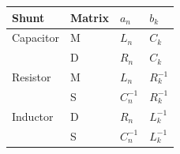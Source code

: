 \begin{margintable}
	\renewcommand{\arraystretch}{1.3}
	\centering
	\caption{{Triangular Matrix Corresponding Values}}
	\begin{tabular}{l l l l}
		\toprule
		Shunt & Matrix & $a_{n}$ & $b_{k}$ \\
		\midrule
		Capacitor & M & $L_{n}$ & $C_{k}$	\\
		& D & $R_{n}$ & $C_{k}$ \\[1.5ex] 
		Resistor & M & $L_{n}$ & $R_{k}^{-1}$ \\ 
		& S & $C_{n}^{-1}$ & $R_{k}^{-1}$ \\[1.5ex] 
		Inductor & D & $R_{n}$ & $L_{k}^{-1}$ \\
		& S & $C_{n}^{-1}$ & $L_{k}^{-1}$ \\ 
		\bottomrule
	\end{tabular}
	\label{table:triangular_matrix_values}	
\end{margintable}



